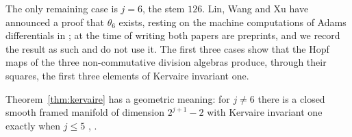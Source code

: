 The only remaining case is $j=6$, the stem $126$. Lin, Wang and Xu \cite{LWX24} have announced a proof that $\theta_6$ exists, resting on the machine computations of Adams differentials in \cite{LWX24b}; at the time of writing both papers are preprints, and we record the result as such and do not use it. The first three cases show that the Hopf maps of the three non-commutative division algebras produce, through their squares, the first three elements of Kervaire invariant one.

\begin{remark}
Theorem~\ref{thm:kervaire} has a geometric meaning: for $j\neq6$ there is a closed smooth framed manifold of dimension $2^{j+1}-2$ with Kervaire invariant one exactly when $j\le5$ \cite{Bro69}, \cite{HHR16}.
\end{remark}
